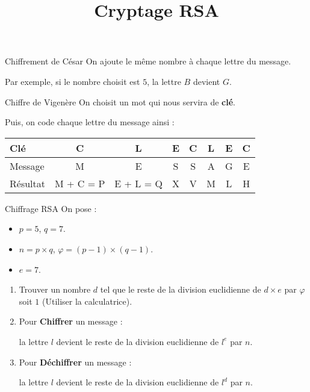 \documentclass{beamer}
\title{Cryptage RSA}
\begin{document}
\begin{frame}{Chiffrement de César}
	On ajoute le même nombre à chaque lettre du message.

	Par exemple, si le nombre choisit est $5$, la lettre $B$ devient $G$.
\end{frame}

\begin{frame}{Chiffre de Vigenère}
	On choisit un mot qui nous servira de \textbf{clé}.

	Puis, on code chaque lettre du message ainsi :

	\begin{center}
		\begin{tabular}{|l|c|c|c|c|c|c|c|}
			\hline
			Clé      & C         & L         & E & C & L & E & C \\ \hline
			Message  & M         & E         & S & S & A & G & E \\ \hline
			Résultat & M + C = P & E + L = Q & X & V & M & L & H \\ \hline
		\end{tabular}
	\end{center}
\end{frame}

\begin{frame}{Chiffrage RSA}
	On pose :
	\begin{itemize}
		\item $p = 5$, $q = 7$.
		\item $n = p \times q$, $φ = (p - 1) × (q - 1)$.
		\item $e = 7$.
	\end{itemize}

	\begin{enumerate}
		\item Trouver un nombre $d$ tel que le reste de la division euclidienne de $d \times e$ par $φ$ soit $1$ (Utiliser la calculatrice). %
		\item Pour \textbf{Chiffrer} un message :

		      la lettre $l$ devient le reste de la division euclidienne de $l^e$ par $n$.
		\item Pour \textbf{Déchiffrer} un message :

		      la lettre $l$ devient le reste de la division euclidienne de $l^d$ par $n$.
	\end{enumerate}
\end{frame}
\end{document}
